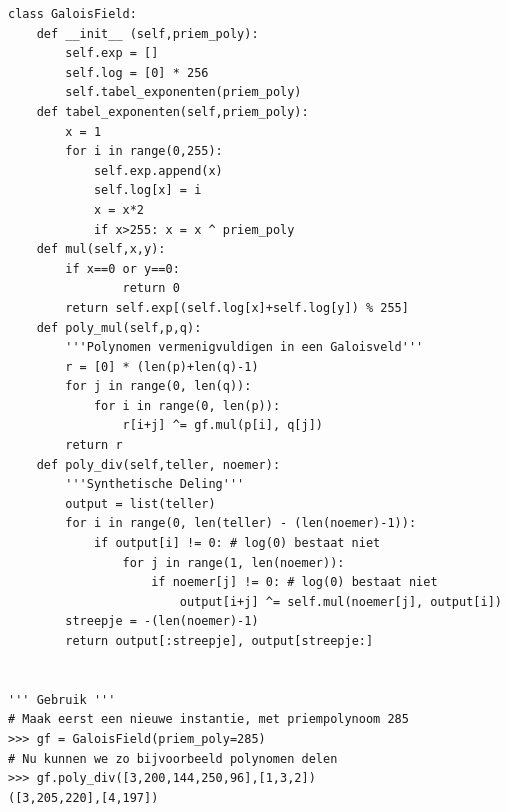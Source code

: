 \documentclass{article}
\begin{document}
\begin{verbatim}
class GaloisField:
    def __init__ (self,priem_poly):
        self.exp = []
        self.log = [0] * 256
        self.tabel_exponenten(priem_poly)
    def tabel_exponenten(self,priem_poly):
        x = 1
        for i in range(0,255):
            self.exp.append(x)
            self.log[x] = i
            x = x*2
            if x>255: x = x ^ priem_poly
    def mul(self,x,y):
        if x==0 or y==0:
                return 0
        return self.exp[(self.log[x]+self.log[y]) % 255]
    def poly_mul(self,p,q):
        '''Polynomen vermenigvuldigen in een Galoisveld'''
        r = [0] * (len(p)+len(q)-1)
        for j in range(0, len(q)):
            for i in range(0, len(p)):
                r[i+j] ^= gf.mul(p[i], q[j])
        return r
    def poly_div(self,teller, noemer):
        '''Synthetische Deling'''
        output = list(teller)
        for i in range(0, len(teller) - (len(noemer)-1)):
            if output[i] != 0: # log(0) bestaat niet
                for j in range(1, len(noemer)):
                    if noemer[j] != 0: # log(0) bestaat niet
                        output[i+j] ^= self.mul(noemer[j], output[i])
        streepje = -(len(noemer)-1)
        return output[:streepje], output[streepje:]


''' Gebruik '''
# Maak eerst een nieuwe instantie, met priempolynoom 285
>>> gf = GaloisField(priem_poly=285)
# Nu kunnen we zo bijvoorbeeld polynomen delen
>>> gf.poly_div([3,200,144,250,96],[1,3,2])
([3,205,220],[4,197])
\end{verbatim}
\end{document}
